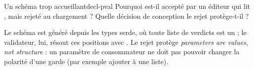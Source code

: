 \begin{exercice}{Un schéma trop accueillant}{decl-pval}
Pourquoi  est-il accepté par un éditeur qui lit , mais rejeté au chargement ? Quelle décision de conception le rejet protège-t-il ?
\end{exercice}
\begin{solution}
Le schéma est généré depuis les types serde, où toute liste de verdicts est un  ; le validateur, lui, résout ces positions avec . Le rejet protège \og \emph{parameters are values, not structure}\fg{} : un paramètre de consommateur ne doit pas pouvoir changer la polarité d'une garde (par exemple ajouter  à une liste).
\end{solution}
